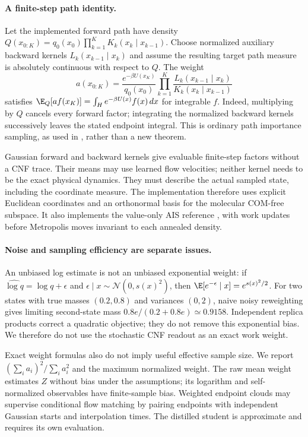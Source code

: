 \paragraph{A finite-step path identity.}
Let the implemented forward path have density
$Q(x_{0:K})=q_0(x_0)\prod_{k=1}^K K_k(x_k\mid x_{k-1})$.
Choose normalized auxiliary backward kernels $L_k(x_{k-1}\mid x_k)$ and assume
the resulting target path measure is absolutely continuous with respect to $Q$.
The weight
\begin{equation}
 a(x_{0:K})=
 \frac{e^{-\beta U(x_K)}}{q_0(x_0)}
 \prod_{k=1}^K\frac{L_k(x_{k-1}\mid x_k)}
                         {K_k(x_k\mid x_{k-1})}
 \label{eq:finitework}
\end{equation}
satisfies $\E_Q[a f(x_K)]=\int_H e^{-\beta U(x)}f(x)\,dx$ for integrable $f$.
Indeed, multiplying by $Q$ cancels every forward factor; integrating the
normalized backward kernels successively leaves the stated endpoint integral.
This is ordinary path importance sampling, as used in
\citet{snf2020,feat2025}, rather than a new theorem.

Gaussian forward and backward kernels give evaluable finite-step factors
without a CNF trace. Their means may use learned flow velocities; neither
kernel needs to be the exact physical dynamics. They must describe the
actual sampled state, including the coordinate measure. The implementation
therefore uses explicit Euclidean coordinates and an orthonormal basis for
the molecular COM-free subspace. It also implements the value-only AIS
reference \citep{neal2001ais}, with work updates before Metropolis moves
invariant to each annealed density.

\paragraph{Noise and sampling efficiency are separate issues.}
An unbiased log estimate is not an unbiased exponential weight:
if $\widehat{\log q}=\log q+\epsilon$ and
$\epsilon\mid x\sim\mathcal N(0,s(x)^2)$, then
$\E[e^{-\epsilon}\mid x]=e^{s(x)^2/2}$.
For two states with true masses $(0.2,0.8)$ and variances $(0,2)$, naive noisy
reweighting gives limiting second-state mass
$0.8e/(0.2+0.8e)\simeq0.9158$. Independent replica products correct a quadratic
objective; they do not remove this exponential bias. We therefore do not use
the stochastic CNF readout as an exact work weight.

Exact weight formulas also do not imply useful effective sample size.
We report $(\sum_i a_i)^2/\sum_i a_i^2$ and the maximum normalized weight.
The raw mean weight estimates $Z$ without bias under the assumptions; its
logarithm and self-normalized observables have finite-sample bias. Weighted
endpoint clouds may supervise conditional flow matching by pairing endpoints
with independent Gaussian starts and interpolation times. The distilled
student is approximate and requires its own evaluation.

